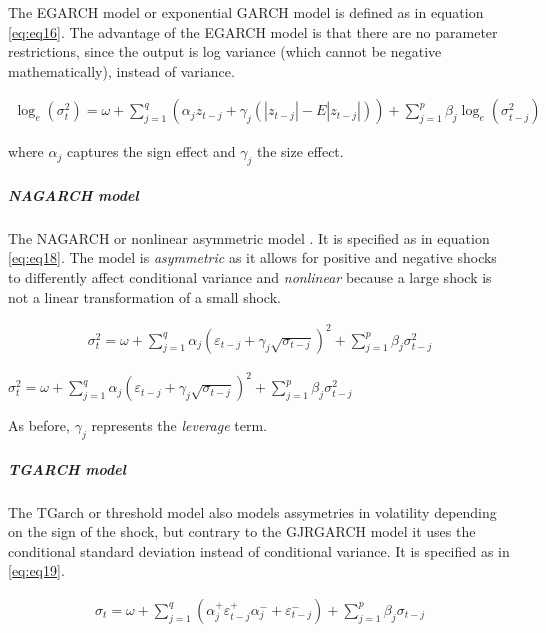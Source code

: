 \documentclass[a4paper, twoside]{templates/ociamthesis}
\begin{document}
\noindent The EGARCH model or exponential GARCH model \autocite{nelson1991} is defined as in equation \eqref{eq:eq16}. The advantage of the EGARCH model is that there are no parameter restrictions, since the output is log variance (which cannot be negative mathematically), instead of variance.

\begin{align}
\log_e(\sigma_t^2) = \omega + \sum\limits_{j=1}^q (\alpha_j z_{t-j} + \gamma_j (|z_{t-j}| - E|z_{t-j}|))+ \sum\limits_{j = 1}^p \beta_j \log_e(\sigma_{t-j}^2)
 \label{eq:eq16}
\end{align}

\noindent where \(\alpha_j\) captures the sign effect and \(\gamma_j\) the size effect.

\hypertarget{nagarch-model}{%
\subparagraph{NAGARCH model}\label{nagarch-model}}

\noindent The NAGARCH or nonlinear asymmetric model \autocite{engle1993}. It is specified as in equation \eqref{eq:eq18}. The model is \emph{asymmetric} as it allows for positive and negative shocks to differently affect conditional variance and \emph{nonlinear} because a large shock is not a linear transformation of a small shock.

\begin{align}
\sigma_t^2 = \omega + \sum\limits_{j=1}^q \alpha_j (\varepsilon_{t-j}+ \gamma_j \sqrt{\sigma_{t-j}})^2 + \sum\limits_{j = 1}^p \beta_j \sigma_{t-j}^2
 \label{eq:eq18}
\end{align}

\(\sigma_t^2 = \omega + \sum\limits_{j=1}^q \alpha_j (\varepsilon_{t-j}+ \gamma_j \sqrt{\sigma_{t-j}})^2 + \sum\limits_{j = 1}^p \beta_j \sigma_{t-j}^2\)

As before, \(\gamma_j\) represents the \emph{leverage} term.

\hypertarget{tgarch-model}{%
\subparagraph{TGARCH model}\label{tgarch-model}}

\noindent The TGarch or threshold model \autocite{zakoian1994} also models assymetries in volatility depending on the sign of the shock, but contrary to the GJRGARCH model it uses the conditional standard deviation instead of conditional variance. It is specified as in \eqref{eq:eq19}.

\begin{align}
\sigma_t = \omega + \sum\limits_{j=1}^q (\alpha_j^+ \varepsilon_{t-j}^+ \alpha_j^{-} + \varepsilon_{t-j}^{-}) + \sum\limits_{j = 1}^p \beta_j \sigma_{t-j}
 \label{eq:eq19}
\end{align}
\end{document}
